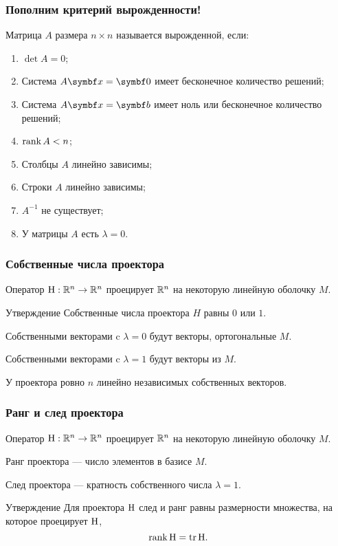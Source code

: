 \begin{frame}
    \frametitle{Пополним критерий вырожденности!}

    Матрица $A$ размера $n\times n$ называется \alert{вырожденной}, если:

    \begin{enumerate}
        \item $\det A = 0$; 
        \item Система $A \bx = \bzero$ имеет бесконечное количество решений; 
        \item Система $A \bx = \bb$ имеет ноль или бесконечное количество решений; 
        \item $\rank A < n$; 
        \item Столбцы $A$ линейно зависимы; 
        \item Строки $A$ линейно зависимы; 
        \item $A^{-1}$ не существует; 
        \item \alert{У матрицы $A$ есть $\lambda=0$.}
    \end{enumerate}


\end{frame}



\begin{frame}
    \frametitle{Собственные числа проектора}

    Оператор $\mathrm{H}: \mathbb{R}^n \to \mathbb{R}^n$ проецирует $\mathbb{R}^n$ на некоторую линейную оболочку $M$. \pause
    
    \begin{block}{Утверждение}
        Собственные числа проектора $H$ равны $0$ или $1$. \pause
        
        Собственными векторами c $\lambda=0$ будут векторы, ортогональные $M$. \pause

        Собственными векторами c $\lambda=1$ будут векторы из  $M$. \pause

        У проектора ровно $n$ линейно независимых собственных векторов. 
    \end{block}

    

\end{frame}


\begin{frame}
\frametitle{Ранг и след проектора}

Оператор $\mathrm{H}: \mathbb{R}^n \to \mathbb{R}^n$ проецирует $\mathbb{R}^n$ на некоторую линейную оболочку $M$. \pause

    Ранг проектора — число элементов в базисе $M$. \pause

    След проектора — кратность собственного числа $\lambda=1$. \pause

    \begin{block}{Утверждение}
        Для проектора $\mathrm{H}$ след и ранг равны размерности множества, на которое проецирует $\mathrm{H}$,
        \[
        \rank \HH = \trace \HH.    
        \]
    \end{block}


\end{frame}